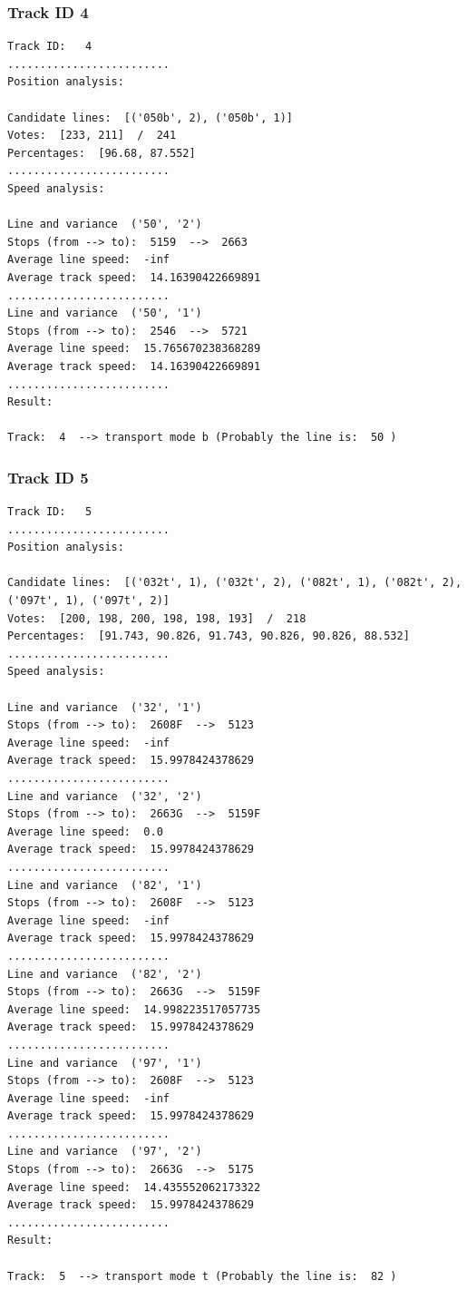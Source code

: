 \documentclass{article}
\begin{document}
\subsubsection{Track ID 4}
\begin{verbatim}
Track ID:   4
.........................
Position analysis: 

Candidate lines:  [('050b', 2), ('050b', 1)] 
Votes:  [233, 211]  /  241
Percentages:  [96.68, 87.552]
.........................
Speed analysis: 

Line and variance  ('50', '2') 
Stops (from --> to):  5159  -->  2663
Average line speed:  -inf
Average track speed:  14.16390422669891
.........................
Line and variance  ('50', '1') 
Stops (from --> to):  2546  -->  5721
Average line speed:  15.765670238368289
Average track speed:  14.16390422669891
.........................
Result: 

Track:  4  --> transport mode b (Probably the line is:  50 )
\end{verbatim}
\subsubsection{Track ID 5}
\begin{verbatim}
Track ID:   5
.........................
Position analysis: 

Candidate lines:  [('032t', 1), ('032t', 2), ('082t', 1), ('082t', 2), ('097t', 1), ('097t', 2)] 
Votes:  [200, 198, 200, 198, 198, 193]  /  218
Percentages:  [91.743, 90.826, 91.743, 90.826, 90.826, 88.532]
.........................
Speed analysis: 

Line and variance  ('32', '1') 
Stops (from --> to):  2608F  -->  5123
Average line speed:  -inf
Average track speed:  15.9978424378629
.........................
Line and variance  ('32', '2') 
Stops (from --> to):  2663G  -->  5159F
Average line speed:  0.0
Average track speed:  15.9978424378629
.........................
Line and variance  ('82', '1') 
Stops (from --> to):  2608F  -->  5123
Average line speed:  -inf
Average track speed:  15.9978424378629
.........................
Line and variance  ('82', '2') 
Stops (from --> to):  2663G  -->  5159F
Average line speed:  14.998223517057735
Average track speed:  15.9978424378629
.........................
Line and variance  ('97', '1') 
Stops (from --> to):  2608F  -->  5123
Average line speed:  -inf
Average track speed:  15.9978424378629
.........................
Line and variance  ('97', '2') 
Stops (from --> to):  2663G  -->  5175
Average line speed:  14.435552062173322
Average track speed:  15.9978424378629
.........................
Result: 

Track:  5  --> transport mode t (Probably the line is:  82 )
\end{verbatim}
\end{document}
